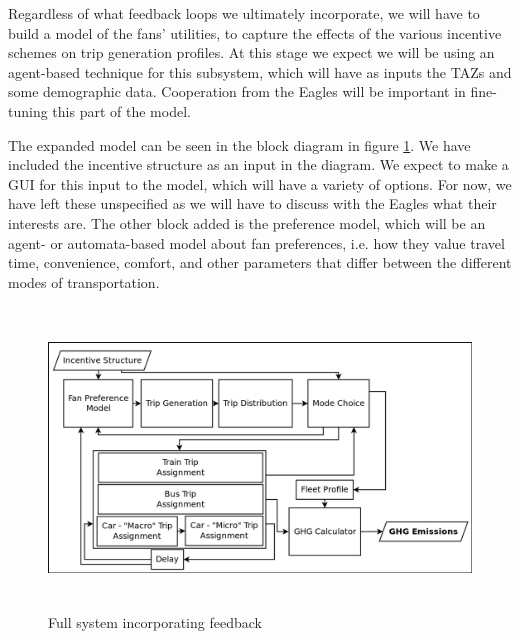 Regardless of what feedback loops we ultimately incorporate, we will
have to build a model of the fans' utilities, to capture the effects
of the various incentive schemes on trip generation profiles. At this
stage we expect we will be using an agent-based technique for this
subsystem, which will have as inputs the TAZs and some demographic
data. Cooperation from the Eagles will be important in fine-tuning
this part of the model.

The expanded model can be seen in the block diagram in figure
\ref{mainsystem2}. We have included the incentive structure as an
input in the diagram. We expect to make a GUI for this input to the
model, which will have a variety of options. For now, we have left
these unspecified as we will have to discuss with the Eagles what
their interests are. The other block added is the preference model,
which will be an agent- or automata-based model about fan preferences,
i.e. how they value travel time, convenience, comfort, and other
parameters that differ between the different modes of transportation.

\begin{figure}[htp]
  \centering
  \includegraphics[height=8cm]{graphics/fullsystem2.png}
  \caption{Full system incorporating feedback}
  \label{mainsystem2}
\end{figure}


